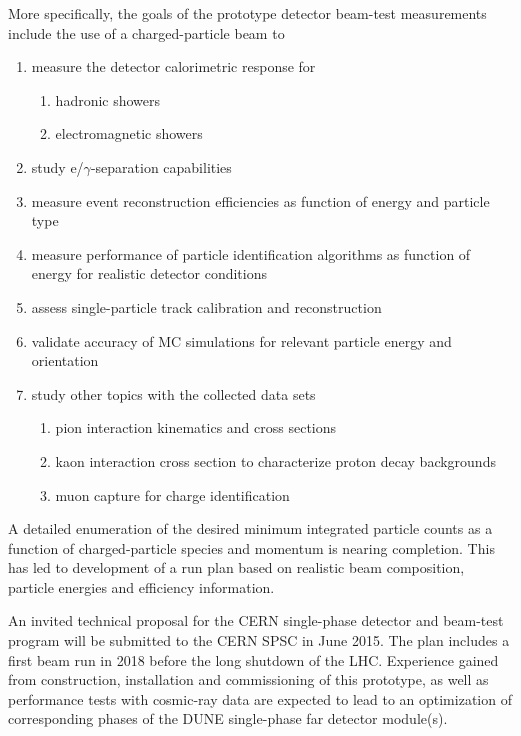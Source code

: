 More specifically, the goals of the prototype detector beam-test measurements include
the use of a charged-particle beam to
\begin{enumerate}
\item measure the detector calorimetric response for
\begin{enumerate}
	\item hadronic showers
	\item electromagnetic showers
\end{enumerate}
\item study e/$\gamma$-separation capabilities
\item measure event reconstruction efficiencies as function of energy
  and particle type
\item measure performance of particle identification algorithms as
  function of energy for realistic detector conditions
\item assess single-particle track calibration and reconstruction
\item validate accuracy of MC simulations for relevant particle energy and orientation %
\item study other topics with the collected data sets
 \begin{enumerate}
    \item pion interaction kinematics and cross sections
    \item kaon interaction cross section to characterize proton decay backgrounds
    \item muon capture for charge identification
 \end{enumerate}
\end{enumerate}
A detailed enumeration of the desired minimum integrated particle
counts as a function of charged-particle species and momentum is
nearing completion. This has led to development of a run plan based on
realistic beam composition, particle energies and efficiency
information.

An invited technical proposal for the CERN single-phase detector and
beam-test program\cite{CERN_single-phase_proposal} will be submitted
to the CERN SPSC in June 2015. The plan includes a first beam run in
2018 before the long shutdown of the LHC. Experience gained from
construction, installation and commissioning of this prototype, as
well as performance tests with cosmic-ray data are expected to lead to
an optimization of corresponding phases of the DUNE single-phase far
detector module(s).

